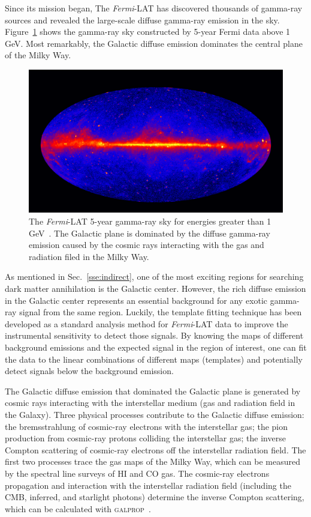 \documentclass[doublespace,nopageskip]{VTthesis} %
\begin{document}
Since its mission began, The \textit{Fermi}-LAT has discovered thousands of gamma-ray sources and revealed the large-scale diffuse gamma-ray emission in the sky. Figure~\ref{fig:gamma_sky} shows the gamma-ray sky constructed by 5-year Fermi data above 1 GeV. Most remarkably, the Galactic diffuse emission dominates the central plane of the Milky Way.

\begin{figure}[htb]
    \centering
    \includegraphics[width=1\textwidth]{Figures/Intro/Femri_5_year_2500x1407.jpg}
    \caption{The \textit{Fermi}-LAT 5-year gamma-ray sky for energies greater than 1 GeV~\cite{NASAs2013}. The Galactic plane is dominated by the diffuse gamma-ray emission caused by the cosmic rays interacting with the gas and radiation filed in the Milky Way.}
    \label{fig:gamma_sky}
\end{figure}

As mentioned in Sec.~\ref{sse:indirect}, one of the most exciting regions for searching dark matter annihilation is the Galactic center. However, the rich diffuse emission in the Galactic center represents an essential background for any exotic gamma-ray signal from the same region. Luckily, the template fitting technique has been developed as a standard analysis method for \textit{Fermi}-LAT data to improve the instrumental sensitivity to detect those signals. By knowing the maps of different background emissions and the expected signal in the region of interest, one can fit the data to the linear combinations of different maps (templates) and potentially detect signals below the background emission.

The Galactic diffuse emission that dominated the Galactic plane is generated by cosmic rays interacting with the interstellar medium (gas and radiation field in the Galaxy). Three physical processes contribute to the Galactic diffuse emission: the bremsstrahlung of cosmic-ray electrons with the interstellar gas; the pion production from cosmic-ray protons colliding the interstellar gas; the inverse Compton scattering of cosmic-ray electrons off the interstellar radiation field. The first two processes trace the gas maps of the Milky Way, which can be measured by the spectral line surveys of HI and CO gas. The cosmic-ray electrons propagation and interaction with the interstellar radiation field (including the CMB, inferred, and starlight photons) determine the inverse Compton scattering, which can be calculated with \textsc{galprop}~\cite{2017ApJ...846...67P}.
\end{document}

